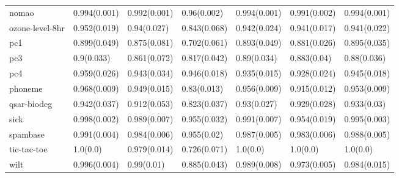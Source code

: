 \begin{tabular}{lllllll}
nomao & 0.994(0.001) & 0.992(0.001) & 0.96(0.002) & 0.994(0.001) & 0.991(0.002) & 0.994(0.001) \\
ozone-level-8hr & 0.952(0.019) & 0.94(0.027) & 0.843(0.068) & 0.942(0.024) & 0.941(0.017) & 0.941(0.022) \\
pc1 & 0.899(0.049) & 0.875(0.081) & 0.702(0.061) & 0.893(0.049) & 0.881(0.026) & 0.895(0.035) \\
pc3 & 0.9(0.033) & 0.861(0.072) & 0.817(0.042) & 0.89(0.034) & 0.883(0.04) & 0.88(0.036) \\
pc4 & 0.959(0.026) & 0.943(0.034) & 0.946(0.018) & 0.935(0.015) & 0.928(0.024) & 0.945(0.018) \\
phoneme & 0.968(0.009) & 0.949(0.015) & 0.83(0.013) & 0.956(0.009) & 0.915(0.012) & 0.953(0.009) \\
qsar-biodeg & 0.942(0.037) & 0.912(0.053) & 0.823(0.037) & 0.93(0.027) & 0.929(0.028) & 0.933(0.03) \\
sick & 0.998(0.002) & 0.989(0.007) & 0.955(0.032) & 0.991(0.007) & 0.954(0.019) & 0.995(0.003) \\
spambase & 0.991(0.004) & 0.984(0.006) & 0.955(0.02) & 0.987(0.005) & 0.983(0.006) & 0.988(0.005) \\
tic-tac-toe & 1.0(0.0) & 0.979(0.014) & 0.726(0.071) & 1.0(0.0) & 1.0(0.0) & 1.0(0.0) \\
wilt & 0.996(0.004) & 0.99(0.01) & 0.885(0.043) & 0.989(0.008) & 0.973(0.005) & 0.984(0.015) \\
\bottomrule
\end{tabular}
